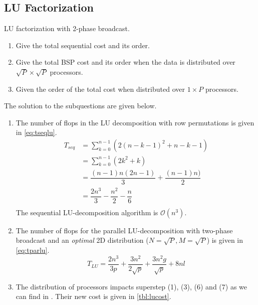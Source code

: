 \documentclass[../main.tex]{subfiles}
\begin{document}
\subsection{LU Factorization}
\begin{question}
LU factorization with 2-phase broadcast.
\begin{enumerate}
	\item Give the total sequential cost and its order.
	\item Give the total BSP cost and its order when the data is distributed over $\sqrt{P} \times \sqrt{P}$
	processors.
	\item Given the order of the total cost when distributed over $1 \times P$ processors.
\end{enumerate}
\end{question}
\begin{solution} The solution to the subquestions are given below.
\begin{enumerate}
	\item The number of flops in the LU decomposition with row permutations is given in \autoref{eq:tseqlu}.
	\begin{equation}\label{eq:tseqlu}
		\begin{array}{ll}
		T_{seq} & = \displaystyle\sum_{k=0}^{n-1} (2(n - k - 1)^2 + n - k -1) \\
				& = \displaystyle\sum_{k=0}^{n-1} (2k^2 + k) \\
				& = \dfrac{(n-1)n(2n-1)}{3} + \dfrac{(n-1)n)}{2} \\
				& = \dfrac{2n^3}{3} - \dfrac{n^2}{2} - \dfrac{n}{6} \\
		\end{array}
	\end{equation}
	The sequential LU-decomposition algorithm is $\mathcal{O}(n^3)$.
	\item The number of flops for the parallel LU-decomposition with two-phase broadcast and an \emph{optimal} 2D distribution ($N = \sqrt{P}, M = \sqrt{P}$) is given in \autoref{eq:tparlu}.
	\begin{equation}\label{eq:tparlu}
			T_{LU}  = \dfrac{2n^3}{3p} + \dfrac{3n^2}{2\sqrt{p}} + \dfrac{3n^2g}{\sqrt{p}} + 8nl
	\end{equation}
\item The distribution of processors impacts superstep (1), (3), (6) and (7) as we can find in \cite[p.~70]{bisseling04}. Their new cost is given in \autoref{tbl:lucost}.
	\begin{table}[H]
	\centering
	\begin{tabular}{ll}

\end{tabular}
\end{table}
\end{enumerate}
\end{solution}
\end{document}
